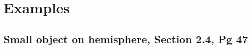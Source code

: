 \documentclass[12pt]{article}
\begin{document}
\section{Examples}
    \subsection{Small object on hemisphere, Section 2.4, Pg 47}
    
    
    






































    
\newpage
\end{document}
